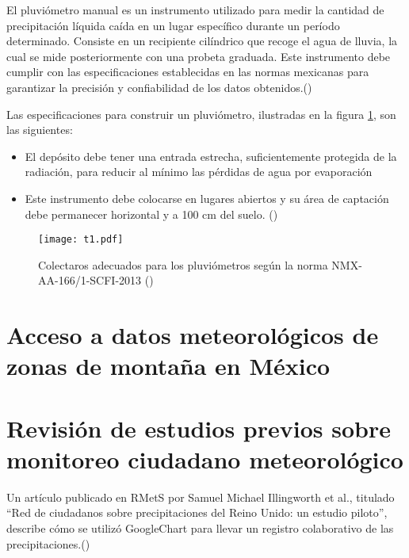 \begin{definition}

El pluviómetro manual es un instrumento utilizado para medir la cantidad de precipitación líquida caída en un lugar específico durante un período determinado. Consiste en un recipiente cilíndrico que recoge el agua de lluvia, la cual se mide posteriormente con una probeta graduada. Este instrumento debe cumplir con las especificaciones establecidas en las normas mexicanas para garantizar la precisión y confiabilidad de los datos obtenidos.(\cite{semarnat_pluviometro})
\end{definition}

Las especificaciones para construir un pluviómetro, ilustradas en la figura \ref{t1}, son las siguientes:
\begin{itemize}
    \item El depósito debe tener una entrada estrecha, suficientemente protegida de la radiación, para reducir al mínimo las pérdidas de agua por evaporación
    \item Este instrumento debe colocarse en lugares abiertos y su área de captación debe permanecer horizontal y a 100 cm del suelo. (\cite{se2013})
\end{itemize}

\begin{figure}[ht]
\centering
  \texttt{[image: t1.pdf]}
  \caption{Colectaros adecuados para los pluviómetros según la norma NMX-AA-166/1-SCFI-2013 (\cite{se2013})}
  \label{t1}
\end{figure}

\section{Acceso a datos meteorológicos de zonas de montaña en México}
















\section{Revisión de estudios previos sobre monitoreo ciudadano meteorológico}

Un artículo publicado en RMetS por Samuel Michael Illingworth et al., titulado “Red de ciudadanos sobre precipitaciones del Reino Unido: un estudio piloto”, describe cómo se utilizó GoogleChart para llevar un registro colaborativo de las precipitaciones.(\cite{illingworth2021ukprecipitation}) 

